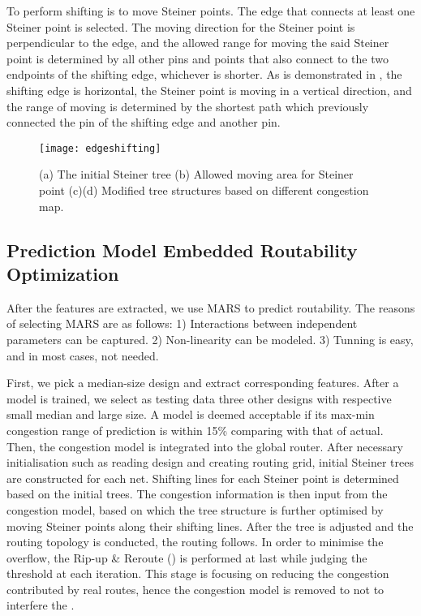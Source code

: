 To perform shifting is to move Steiner points. The edge that connects at least one Steiner point is selected. The moving direction for the Steiner point is perpendicular to the edge, and the allowed range for moving the said Steiner point is determined by all other pins and points that also connect to the two endpoints of the shifting edge, whichever is shorter. As is demonstrated in , the shifting edge is horizontal, the Steiner point is moving in a vertical direction, and the range of moving is determined by the shortest path which previously connected the pin of the shifting edge and another pin. 
\begin{figure}[htbp]
    \centerline{\texttt{[image: edgeshifting]}}
    \caption{(a) The initial Steiner tree (b) Allowed moving area for Steiner point (c)(d) Modified tree structures based on different congestion map.}
    \label{fig:edgeshifting}
\end{figure}

\subsection{Prediction Model Embedded Routability Optimization}
After the features are extracted, we use MARS \cite{MARS} to predict routability. The reasons of selecting MARS are as follows: 1) Interactions between independent parameters can be captured. 2) Non-linearity can be modeled. 3) Tunning is easy, and in most cases, not needed. 

First, we pick a median-size design and extract corresponding features.
After a model is trained, we select as testing data three other designs with respective small median and large size.
A model is deemed acceptable if its max-min congestion range of prediction is within 15\% comparing with that of actual.
Then, the congestion model is integrated into the global router.
After necessary initialisation such as reading design and creating routing grid, initial Steiner trees are constructed for each net.
Shifting lines for each Steiner point is determined based on the initial trees.
The congestion information is then input from the congestion model, based on which the tree structure is further optimised by moving Steiner points along their shifting lines.
After the tree is adjusted and the routing topology is conducted, the routing follows.
In order to minimise the overflow, the Rip-up \& Reroute () is performed at last while judging the threshold at each iteration.
This stage is focusing on reducing the congestion contributed by real routes, hence the congestion model is removed to not to interfere the .

